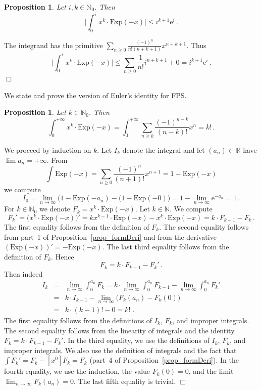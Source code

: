\documentclass[10pt]{article}
\def\N{\mathbb{N}}
\def\R{\mathbb{R}}
\def\proof{\par\noindent{\em Proof. }}
\def\eproof{\hfill{$\Box$}\bigskip}
\def\sus{\subset}
\newtheorem{prop}[thm]{Proposition}
\begin{document}
\begin{prop}\label{prop_fakeLM}
Let $i,k\in\N_0$. Then
$${\textstyle
\big|\int_0^i x^k\cdot\mathrm{Exp}(-x)\big|\le i^{k+1}\mathrm{e}^i\,.
}
$$
\end{prop}
\proof
The integrand has the primitive  
$\sum_{n\ge0}\frac{(-1)^n}{n!(n+k+1)}x^{n+k+1}$. Thus 
$$
{\textstyle
\big|\int_0^i x^k\cdot\mathrm{Exp}(-x)\big|\le
\sum_{n\ge0}\frac{1}{n!}i^{n+k+1}+0=i^{k+1}\mathrm{e}^i\,.
}
$$
\eproof

We state and prove the version of Euler's identity for FPS. 

\begin{prop}\label{prop_formalEuId}
Let $k\in\N_0$. Then
$${\textstyle
\int_0^{+\infty} x^k\cdot\mathrm{Exp}(-x)=\int_0^{+\infty} \sum_{n\ge k}\frac{(-1)^{n-k}}{(n-k)!}x^n=k!\,.
}
$$
\end{prop}
\proof
We proceed by induction on $k$. Let 
$I_k$ denote the integral and let
$(a_n)\sus\R$ have $\lim a_n=+\infty$. From  
$$
{\textstyle
\int\mathrm{Exp}(-x)=\sum_{n\ge0}\frac{(-1)^n}{(n+1)!}x^{n+1}=1-\mathrm{Exp}(-x)
}
$$
we compute
$${\textstyle
I_0=\lim_{n\to\infty}
\big(1-\mathrm{Exp}(-a_n)-(1-\mathrm{Exp}(-0)\big)=1-\lim_{n\to\infty}
\mathrm{e}^{-a_n}=1\,.
}
$$
For $k\in\N_0$ we denote 
$F_k=x^k\cdot\mathrm{Exp}(-x)$.
Let $k\in\N$. We compute 
$$
F_k'=\big(x^k\cdot\mathrm{Exp}(-x)\big)'=kx^{k-1}\cdot\mathrm{Exp}(-x)-x^k\cdot\mathrm{Exp}(-x)=k\cdot F_{k-1}-F_k\,.
$$
The first equality follows from the definition of $F_k$. The second 
equality follows from part~1 of Proposition~\ref{prop_formDeri} and 
from the derivative 
$(\mathrm{Exp}(-x))'=-
\mathrm{Exp}(-x)$. The last third
equality follows from the definition of $F_k$. Hence 
$$
F_k=k\cdot F_{k-1}-F_k'\,. 
$$
Then indeed
\begin{eqnarray*}
I_k&=&\lim_{n\to\infty}{\textstyle
\int_0^{a_n}F_k}
=k\cdot\lim_{n\to\infty}{\textstyle\int_0^{a_n}F_{k-1}-}
\lim_{n\to\infty}{\textstyle\int_0^{a_n}F_k'}\\
&=&k\cdot I_{k-1}-\lim_{n\to\infty}\big(F_k(a_n)-F_k(0)\big)\\
&=&k\cdot(k-1)!-0=k!\;.
\end{eqnarray*}
The first equality follows from the definitions of $I_k$, $F_k$, and 
improper integrals. The second equality follows from the linearity 
of integrals and the identity $F_k=k\cdot F_{k-1}-F_k'$. In the 
third equality, we use the definitions of $I_k$, $F_k$, and 
improper integrals. We also use the definition of integrals and the fact 
that $\int F_k'=F_k-[x^0]F_k=F_k$ (part~4 of 
Proposition~\ref{prop_formDeri}). In the fourth equality, we use the 
induction, the value $F_k(0)=0$, 
and the limit $\lim_{n\to\infty}F_k(a_n)=0$. The last fifth equality is trivial.
\eproof
\end{document}
